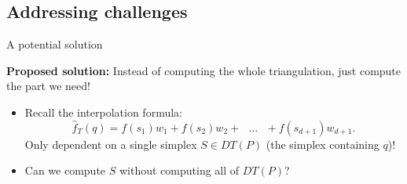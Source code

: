 \documentclass[xcolor=dvipsnames]{beamer}
\begin{document}
\subsection{Addressing challenges}
\begin{frame}{A potential solution}

{\bf Proposed solution:} Instead of computing the whole triangulation, just 
compute the part we need!
\begin{itemize}
\item Recall the interpolation formula:
$$
\hat{f}_T (q) = f(s_1) w_1 + f(s_2) w_2 + \text{ $\ldots$ } + f(s_{d+1})w_{d+1}.
$$
Only dependent on a single simplex $S \in DT(P)$ (the simplex containing $q$)!
\item Can we compute $S$ without computing all of $DT(P)$?
\end{itemize}
\end{frame}
\end{document}
